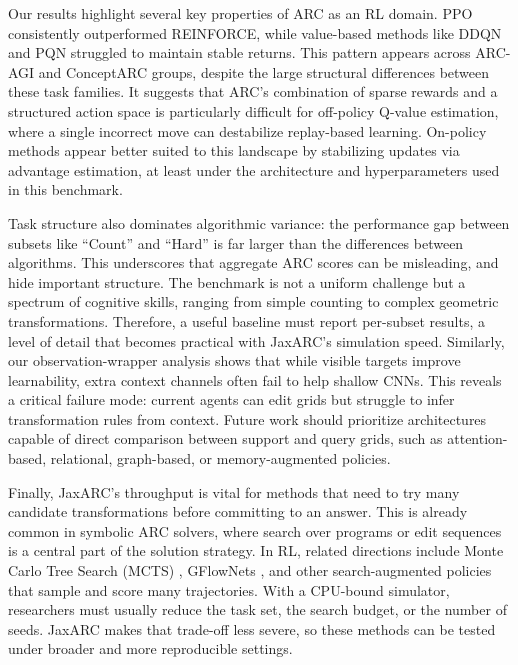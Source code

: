 Our results highlight several key properties of ARC as an RL domain. PPO consistently outperformed REINFORCE, while value-based methods like DDQN and PQN struggled to maintain stable returns. This pattern appears across ARC-AGI and ConceptARC groups, despite the large structural differences between these task families. It suggests that ARC's combination of sparse rewards and a structured action space is particularly difficult for off-policy Q-value estimation, where a single incorrect move can destabilize replay-based learning. On-policy methods appear better suited to this landscape by stabilizing updates via advantage estimation, at least under the architecture and hyperparameters used in this benchmark.

Task structure also dominates algorithmic variance: the performance gap between subsets like ``Count'' and ``Hard'' is far larger than the differences between algorithms. This underscores that aggregate ARC scores can be misleading, and hide important structure. The benchmark is not a uniform challenge but a spectrum of cognitive skills, ranging from simple counting to complex geometric transformations. Therefore, a useful baseline must report per-subset results, a level of detail that becomes practical with JaxARC's simulation speed. Similarly, our observation-wrapper analysis shows that while visible targets improve learnability, extra context channels often fail to help shallow CNNs. This reveals a critical failure mode: current agents can edit grids but struggle to infer transformation rules from context. Future work should prioritize architectures capable of direct comparison between support and query grids, such as attention-based, relational, graph-based, or memory-augmented policies.

Finally, JaxARC's throughput is vital for methods that need to try many candidate transformations before committing to an answer. This is already common in symbolic ARC solvers, where search over programs or edit sequences is a central part of the solution strategy. In RL, related directions include Monte Carlo Tree Search (MCTS) \citep{silverGeneralReinforcementLearning2018}, GFlowNets \citep{bengioFlowNetworkBased2021}, and other search-augmented policies that sample and score many trajectories. With a CPU-bound simulator, researchers must usually reduce the task set, the search budget, or the number of seeds. JaxARC makes that trade-off less severe, so these methods can be tested under broader and more reproducible settings.

